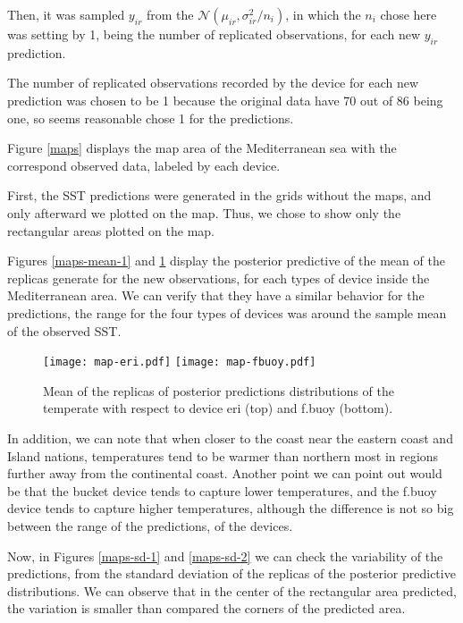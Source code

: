\documentclass{asaproc}
\begin{document}
Then, it was sampled $y_{ir}$ from the $\mathcal{N}(\mu_{ir}, \sigma_{ir}^2/n_i)$, in which the $n_i$ chose here was setting by 1, being the number of replicated observations, for each new $y_{ir}$ prediction. 

The number of replicated observations recorded by the device for each new prediction was chosen to be 1 because the original data have 70 out of 86 being one, so seems reasonable chose 1 for the predictions. 

Figure \ref{maps} displays the map area of the Mediterranean sea with the correspond observed data, labeled by each device.

First, the SST predictions were generated in the grids without the maps, and only afterward we plotted on the map. Thus, we chose to show only the rectangular areas plotted on the map.

Figures \ref{maps-mean-1} and \ref{maps-mean-2} display the posterior predictive of the mean of the replicas generate for the new observations, for each types of device inside the Mediterranean area. We can verify that they have a similar behavior for the predictions, the range for the four types of devices was around the sample mean of the observed SST. 

\begin{figure}[H]
\centering
\texttt{[image: map-eri.pdf]}
\texttt{[image: map-fbuoy.pdf]} 
\caption{Mean of the replicas of posterior predictions distributions of the temperate with respect to device eri (top) and f.buoy (bottom).}
\label{maps-mean-2}
\end{figure}

In addition, we can note that when closer to the coast near the eastern coast and Island nations, temperatures tend to be warmer than northern most in regions further away from the continental coast. Another point we can point out would be that the bucket device tends to capture lower temperatures, and the f.buoy device tends to capture higher temperatures, although the difference is not so big between the range of the predictions, of the devices.

Now, in Figures \ref{maps-sd-1} and \ref{maps-sd-2} we can check the variability of the predictions, from the standard deviation of the replicas of the posterior predictive distributions. We can observe that in the center of the rectangular area predicted, the variation is smaller than compared the corners of the predicted area. 
\end{document}
